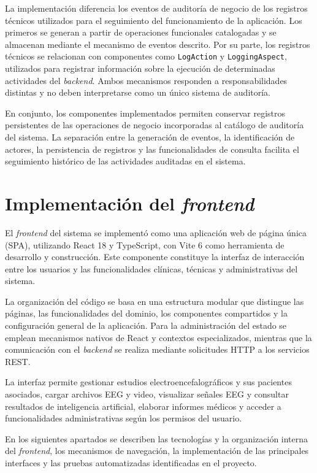 La implementación diferencia los eventos de auditoría de negocio
de los registros técnicos utilizados para el seguimiento del
funcionamiento de la aplicación. Los primeros se generan a partir
de operaciones funcionales catalogadas y se almacenan mediante
el mecanismo de eventos descrito. Por su parte, los registros
técnicos se relacionan con componentes como
\texttt{LogAction} y \texttt{LoggingAspect}, utilizados para
registrar información sobre la ejecución de determinadas
actividades del \textit{backend}. Ambos mecanismos responden a
responsabilidades distintas y no deben interpretarse como un
único sistema de auditoría.

En conjunto, los componentes implementados permiten conservar registros persistentes de las operaciones de negocio incorporadas al catálogo de auditoría del sistema. La separación entre la generación de eventos, la identificación de actores, la persistencia de registros y las funcionalidades de consulta facilita el seguimiento histórico de las actividades auditadas en el sistema.


\section{Implementación del \textit{frontend}}

El \textit{frontend} del sistema se implementó como una
aplicación web de página única (SPA), utilizando
React 18 y TypeScript, con Vite 6 como herramienta
de desarrollo y construcción. Este componente
constituye la interfaz de interacción entre los
usuarios y las funcionalidades clínicas, técnicas
y administrativas del sistema.

La organización del código se basa en una
estructura modular que distingue las páginas,
las funcionalidades del dominio, los componentes
compartidos y la configuración general de la
aplicación. Para la administración del estado
se emplean mecanismos nativos de React y
contextos especializados, mientras que la
comunicación con el \textit{backend} se realiza mediante
solicitudes HTTP a los servicios REST.

La interfaz permite gestionar estudios
electroencefalográficos y sus pacientes
asociados, cargar archivos EEG y video,
visualizar señales EEG y consultar resultados de inteligencia artificial, elaborar informes médicos y
acceder a funcionalidades administrativas
según los permisos del usuario.

En los siguientes apartados se describen
las tecnologías y la organización interna
del \textit{frontend}, los mecanismos de navegación,
la implementación de las principales
interfaces y las pruebas automatizadas
identificadas en el proyecto.


